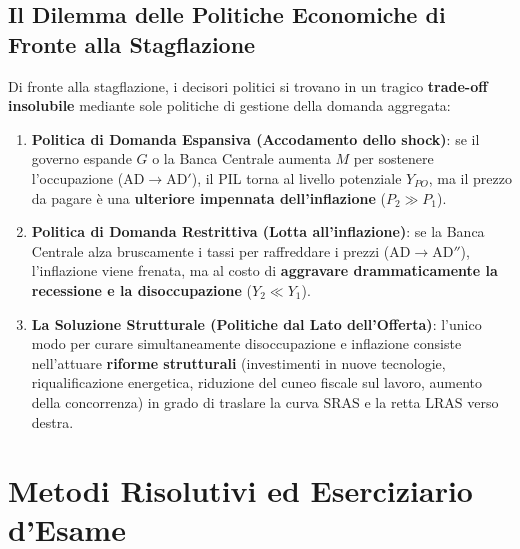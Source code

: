 \subsection{Il Dilemma delle Politiche Economiche di Fronte alla Stagflazione}
Di fronte alla stagflazione, i decisori politici si trovano in un tragico \textbf{trade-off insolubile} mediante sole politiche di gestione della domanda aggregata:
\begin{enumerate}
    \item \textbf{Politica di Domanda Espansiva (Accodamento dello shock)}: se il governo espande $G$ o la Banca Centrale aumenta $M$ per sostenere l'occupazione ($\mathrm{AD} \to \mathrm{AD}'$), il PIL torna al livello potenziale $Y_{PO}$, ma il prezzo da pagare è una \textbf{ulteriore impennata dell'inflazione} ($P_2 \gg P_1$).
    \item \textbf{Politica di Domanda Restrittiva (Lotta all'inflazione)}: se la Banca Centrale alza bruscamente i tassi per raffreddare i prezzi ($\mathrm{AD} \to \mathrm{AD}''$), l'inflazione viene frenata, ma al costo di \textbf{aggravare drammaticamente la recessione e la disoccupazione} ($Y_2 \ll Y_1$).
    \item \textbf{La Soluzione Strutturale (Politiche dal Lato dell'Offerta)}: l'unico modo per curare simultaneamente disoccupazione e inflazione consiste nell'attuare \textbf{riforme strutturali} (investimenti in nuove tecnologie, riqualificazione energetica, riduzione del cuneo fiscale sul lavoro, aumento della concorrenza) in grado di traslare la curva $\mathrm{SRAS}$ e la retta $\mathrm{LRAS}$ verso destra.
\end{enumerate}

\section{Metodi Risolutivi ed Eserciziario d'Esame}


